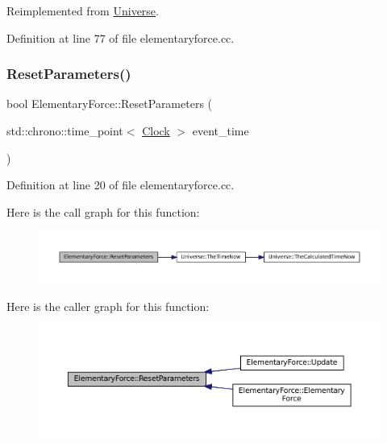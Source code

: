 Reimplemented from \mbox{\hyperlink{class_universe_a0c485c504542409cbb5cfd8543c35b11}{Universe}}.



Definition at line 77 of file elementaryforce.\+cc.

\mbox{\label{class_elementary_force_a1dedcd23a538b87f71ecd43cb36a6db5}} 
\subsubsection{\texorpdfstring{Reset\+Parameters()}{ResetParameters()}}
{\footnotesize\ttfamily bool Elementary\+Force\+::\+Reset\+Parameters (\begin{DoxyParamCaption}\item[{std\+::chrono\+::time\+\_\+point$<$ \mbox{\hyperlink{universe_8h_a0ef8d951d1ca5ab3cfaf7ab4c7a6fd80}{Clock}} $>$}]{event\+\_\+time }\end{DoxyParamCaption})}



Definition at line 20 of file elementaryforce.\+cc.

Here is the call graph for this function\+:\nopagebreak
\begin{figure}[H]
\begin{center}
\leavevmode
\includegraphics[width=350pt]{class_elementary_force_a1dedcd23a538b87f71ecd43cb36a6db5_cgraph}
\end{center}
\end{figure}
Here is the caller graph for this function\+:\nopagebreak
\begin{figure}[H]
\begin{center}
\leavevmode
\includegraphics[width=350pt]{class_elementary_force_a1dedcd23a538b87f71ecd43cb36a6db5_icgraph}
\end{center}
\end{figure}
\mbox{\label{class_elementary_force_a3762cf66ed266b310446417215dec3fa}} 
